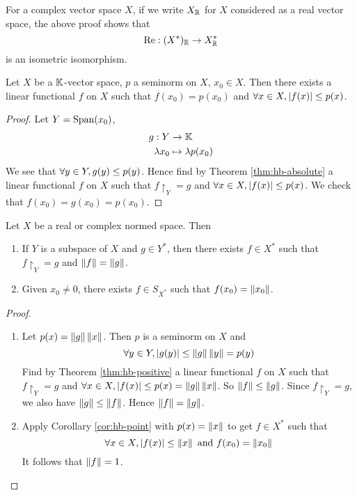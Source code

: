 \documentclass{article}
\begin{document}
\begin{rmk}
  For a complex vector space $X$, if we write $X_\mathbb R$ for $X$ considered as a real vector space, the above proof shows that
  $$\operatorname{Re} : (X^*)_\mathbb R \to X_\mathbb R^*$$
  is an isometric isomorphism.
\end{rmk}

\begin{cor}\label{cor:hb-point}
  Let $X$ be a $\mathbb K$-vector space, $p$ a seminorm on $X$, $x_0 \in X$. Then there exists a linear functional $f$ on $X$ such that $f(x_0) = p(x_0)$ and $\forall x \in X, |f(x)| \le p(x)$.
\end{cor}
\begin{proof}
  Let $Y = \operatorname{Span}(x_0)$,
  \begin{align*}
    g : Y & \to \mathbb K \\
    \lambda x_0 & \mapsto \lambda p(x_0)
  \end{align*}
  We see that $\forall y \in Y, g(y) \le p(y)$. Hence find by Theorem \ref{thm:hb-absolute} a linear functional $f$ on $X$ such that $f\restriction_Y = g$ and $\forall x \in X, |f(x)| \le p(x)$. We check that $f(x_0) = g(x_0) = p(x_0)$.
\end{proof}

\begin{thm}\label{thm:hb-support}
  Let $X$ be a real or complex normed space. Then
  \begin{enumerate}
    \item If $Y$ is a subspace of $X$ and $g \in Y^*$, then there exists $f \in X^*$ such that $f\restriction_Y = g$ and $\left\lVert f\right\rVert = \left\lVert g\right\rVert$.
    \item Given $x_0 \ne 0$, there exists $f \in S_{X^*}$ such that $f(x_0) = \left\lVert x_0\right\rVert$.
  \end{enumerate}
\end{thm}
\begin{proof}~
  \begin{enumerate}
    \item Let $p(x) = \left\lVert g\right\rVert \left\lVert x\right\rVert$. Then $p$ is a seminorm on $X$ and
      $$\forall y \in Y, |g(y)| \le \left\lVert g\right\rVert \left\lVert y\right\rVert = p(y)$$
      Find by Theorem \ref{thm:hb-positive} a linear functional $f$ on $X$ such that $f\restriction_Y = g$ and $\forall x \in X, |f(x)| \le p(x) = \left\lVert g\right\rVert \left\lVert x\right\rVert$. So $\left\lVert f\right\rVert \le \left\lVert g\right\rVert$. Since $f\restriction_Y = g$, we also have $\left\lVert g\right\rVert \le \left\lVert f\right\rVert$. Hence $\left\lVert f\right\rVert = \left\lVert g\right\rVert$.
    \item Apply Corollary \ref{cor:hb-point} with $p(x) = \left\lVert x\right\rVert$ to get $f \in X^*$ such that
      $$\forall x \in X, |f(x)| \le \left\lVert x\right\rVert \text{ and } f(x_0) = \left\lVert x_0\right\rVert$$
      It follows that $\left\lVert f\right\rVert = 1$.
  \end{enumerate}
\end{proof}
\end{document}

